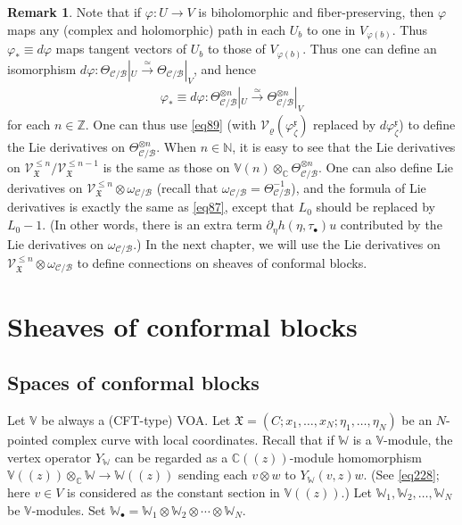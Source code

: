 \documentclass[12pt,b5paper,notitlepage]{report}
\theoremstyle{definition}
\newtheorem{rem}[df]{Remark}
\theoremstyle{plain}
\newcommand{\fk}{\mathfrak}
\newcommand{\mc}{\mathcal}
\newcommand{\scr}{\mathscr}
\newcommand{\blt}{\bullet}
\newcommand{\Vbb}{\mathbb V}
\newcommand{\Wbb}{\mathbb W}
\newcommand{\Cbb}{\mathbb C}
\newcommand{\Nbb}{\mathbb N}
\newcommand{\Zbb}{\mathbb Z}
\numberwithin{equation}{section}
\begin{document}
\begin{rem}\label{lb54}
Note that if $\varphi:U\rightarrow V$  is biholomorphic and fiber-preserving, then $\varphi$ maps any (complex and holomorphic) path in each $U_b$ to one in $V_{\varphi(b)}$. Thus $\varphi_*\equiv d\varphi$ maps tangent vectors of $U_b$ to those of $V_{\varphi(b)}$. Thus one can define an isomorphism  $d\varphi:\Theta_{\mc C/\mc B}|_U\xrightarrow{\simeq}\Theta_{\mc C/\mc B}|_V$, and hence 
\begin{align*}
\varphi_*\equiv d\varphi:\Theta_{\mc C/\mc B}^{\otimes n}|_U\xrightarrow{\simeq}\Theta_{\mc C/\mc B}^{\otimes n}|_V
\end{align*}
for each $n\in\Zbb$. One can thus use \eqref{eq89} (with $\mc V_\varrho(\varphi_\zeta^{\fk x})$ replaced by $d\varphi_\zeta^{\fk x}$)  to define the Lie derivatives  on $\Theta_{\mc C/\mc B}^{\otimes n}$. When $n\in\Nbb$, it is easy to see that the Lie derivatives on $\scr V_{\fk X}^{\leq n}/\scr V_{\fk X}^{\leq n-1}$ is the same as those on $\Vbb(n)\otimes_{\Cbb}\Theta_{\mc C/\mc B}^{\otimes n}$. One can also define Lie derivatives on $\scr V_{\fk X}^{\leq n}\otimes\omega_{\mc C/\mc B}$ (recall that $\omega_{\mc C/\mc B}=\Theta_{\mc C/\mc B}^{-1}$), and the formula of Lie derivatives is exactly the same as \eqref{eq87}, except that  $L_0$ should be replaced by $L_0-1$. (In other words, there is an extra term $\partial_\eta h(\eta,\tau_\blt)u$ contributed by the Lie derivatives on $\omega_{\mc C/\mc B}$.) In the next chapter, we will use the Lie derivatives on $\scr V_{\fk X}^{\leq n}\otimes\omega_{\mc C/\mc B}$ to define connections on sheaves of conformal blocks.
\end{rem}











\chapter{Sheaves of conformal blocks}\label{lb91}





\section{Spaces of conformal blocks}\label{lb34}

Let $\Vbb$ be always a (CFT-type) VOA. Let $\fk X=(C;x_1,\dots,x_N;\eta_1,\dots,\eta_N)$ be an $N$-pointed complex curve with local coordinates. Recall that if $\Wbb$ is a $\Vbb$-module, the vertex operator $Y_\Wbb$ can be regarded as a $\Cbb((z))$-module homomorphism $\Vbb((z))\otimes_{\Cbb}\Wbb\rightarrow\Wbb((z))$ sending each $v\otimes w$ to $Y_{\Wbb}(v,z)w$. (See \eqref{eq228}; here $v\in V$ is considered as the constant section in $\Vbb((z))$.) Let $\Wbb_1,\Wbb_2,\dots,\Wbb_N$ be $\Vbb$-modules. Set \index{Ww@$\Wbb_\blt,w_\blt$} $\Wbb_\blt=\Wbb_1\otimes \Wbb_2\otimes\cdots\otimes \Wbb_N$.  
\end{document}
